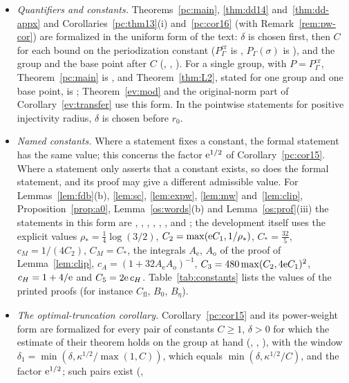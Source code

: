 \begin{itemize}
\item \emph{Quantifiers and constants.} Theorems~\ref{pc:main}, \ref{thm:dd14} and~\ref{thm:dd-appx} and Corollaries~\ref{pc:thm13}(i)
and~\ref{pc:cor16} (with Remark~\ref{rem:pw-cor}) are formalized in the uniform form of the text: $\delta$ is chosen first, then $C$
for each bound on the periodization constant ($P^{\mathrm{cr}}_\Gamma$ is , $P_\Gamma(\sigma)$ is ), and the group and the base
point after $C$ (, , ). For a single group, with $P=P^{\mathrm{cr}}_\Gamma$,
Theorem~\ref{pc:main} is , and Theorem~\ref{thm:L2}, stated for one group and one base point, is ; Theorem~\ref{ev:mod} and the original-norm part of Corollary~\ref{ev:transfer} use this form.
In the pointwise statements for positive injectivity radius, $\delta$ is chosen before $r_0$.
\item \emph{Named constants.} Where a statement fixes a constant, the formal statement has the same value; this concerns the factor
$\mathrm{e}^{1/2}$ of Corollary~\ref{pc:cor15}. Where a statement only asserts that a constant exists,
so does the formal statement, and its proof may give a different admissible value. For Lemmas~\ref{lem:fdb}(b), \ref{lem:sc}, \ref{lem:expw},
\ref{lem:mw} and~\ref{lem:clip}, Proposition~\ref{prop:a0}, Lemma~\ref{os:words}(b) and Lemma~\ref{os:prof}(iii) the statements in this form are ,
, , , , ,  and ; the
development itself uses the explicit values $\rho_*=\tfrac14\log(3/2)$,
$C_2=\max(\mathrm{e} C_1,1/\rho_*)$, $C_*=\tfrac{32}5$, $c_M=1/(4C_2)$, $C_M=C_*$, the integrals $A_{\mathrm e}$, $A_{\mathrm o}$ of the proof of
Lemma~\ref{lem:clip}, $c_A=(1+32A_{\mathrm e}A_{\mathrm o})^{-1}$, $C_3=480\max(C_2,4\mathrm{e} C_1)^2$, $c_H=1+4/\mathrm{e}$ and $C_5=2\mathrm{e}\,c_H$.
Table~\ref{tab:constants} lists the values of the printed proofs (for instance $C_{\mathrm{fl}}$, $B_0$, $B_\eta$).
\item \emph{The optimal-truncation corollary.} Corollary~\ref{pc:cor15} and its power-weight form are formalized for every pair of
constants $C\ge1$, $\delta>0$ for which the estimate of their theorem holds on the group at hand (,
, ), with the window $\delta_1=\min(\delta,\kappa^{1/2}/\max(1,C))$, which equals
$\min(\delta,\kappa^{1/2}/C)$, and the factor $\mathrm{e}^{1/2}$; such pairs exist (,

\end{itemize}
